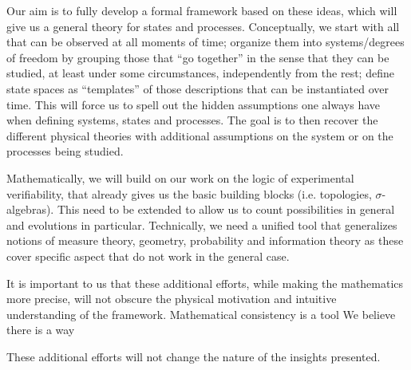 \documentclass[letterpaper,twocolumn]{article}
\begin{document}
Our aim is to fully develop a formal framework based on these ideas, which will give us a general theory for states and processes. Conceptually, we start with all that can be observed at all moments of time; organize them into systems/degrees of freedom by grouping those that ``go together'' in the sense that they can be studied, at least under some circumstances, independently from the rest; define state spaces as ``templates'' of those descriptions that can be instantiated over time. This will force us to spell out the hidden assumptions one always have when defining systems, states and processes. The goal is to then recover the different physical theories with additional assumptions on the system or on the processes being studied.

Mathematically, we will build on our work on the logic of experimental verifiability, that already gives us the basic building blocks (i.e. topologies, $\sigma$-algebras). This need to be extended to allow us to count possibilities in general and evolutions in particular. Technically, we need a unified tool that generalizes notions of measure theory, geometry, probability and information theory as these cover specific aspect that do not work in the general case.

It is important to us that these additional efforts, while making the mathematics more precise, will not obscure the physical motivation and intuitive understanding of the framework. Mathematical consistency is a tool We believe there is a way 

These additional efforts will not change the nature of the insights presented. 


\end{document}
